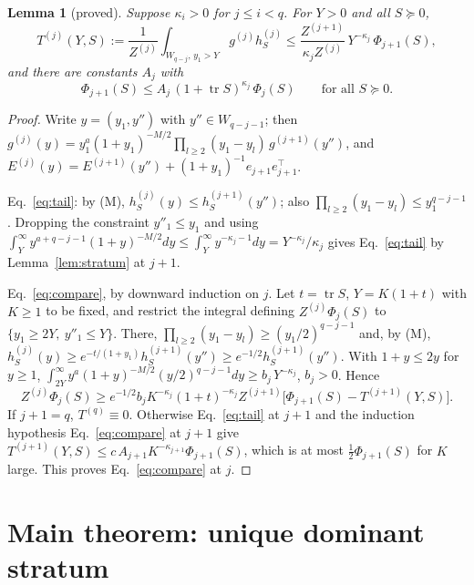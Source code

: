 \documentclass[11pt]{article}
\newcommand{\tr}{\operatorname{tr}}
\newtheorem{lemma}[theorem]{Lemma}
\theoremstyle{remark}
\begin{document}
\begin{lemma}[proved]\label{lem:compare}
Suppose $\kappa_i>0$ for $j\le i<q$.
For $Y>0$ and all $S\succeq0$,
\begin{equation}
  T^{(j)}(Y,S):=\frac1{Z^{(j)}}\int_{W_{q-j},\,y_1>Y}g^{(j)}h^{(j)}_S\le\frac{Z^{(j+1)}}{\kappa_jZ^{(j)}}\,Y^{-\kappa_j}\,\Phi_{j+1}(S),
  \label{eq:tail}
\end{equation}
and there are constants $A_j$ with
\begin{equation}
  \Phi_{j+1}(S)\le A_j\,(1+\tr S)^{\kappa_j}\,\Phi_j(S)\qquad\text{for all }S\succeq0.
  \label{eq:compare}
\end{equation}
\end{lemma}

\begin{proof}
Write $y=(y_1,y'')$ with $y''\in W_{q-j-1}$; then $g^{(j)}(y)=y_1^a(1+y_1)^{-M/2}\prod_{l\ge2}(y_1-y_l)\,g^{(j+1)}(y'')$, and $E^{(j)}(y)=E^{(j+1)}(y'')+(1+y_1)^{-1}e_{j+1}e_{j+1}^\top$.

Eq.~\eqref{eq:tail}: by (M), $h^{(j)}_S(y)\le h^{(j+1)}_S(y'')$; also $\prod_{l\ge2}(y_1-y_l)\le y_1^{q-j-1}$.
Dropping the constraint $y''_1\le y_1$ and using $\int_Y^\infty y^{a+q-j-1}(1+y)^{-M/2}dy\le\int_Y^\infty y^{-\kappa_j-1}dy=Y^{-\kappa_j}/\kappa_j$ gives Eq.~\eqref{eq:tail} by Lemma~\ref{lem:stratum} at $j+1$.

Eq.~\eqref{eq:compare}, by downward induction on $j$.
Let $t=\tr S$, $Y=K(1+t)$ with $K\ge1$ to be fixed, and restrict the integral defining $Z^{(j)}\Phi_j(S)$ to $\{y_1\ge2Y,\ y''_1\le Y\}$.
There, $\prod_{l\ge2}(y_1-y_l)\ge(y_1/2)^{q-j-1}$ and, by (M), $h^{(j)}_S(y)\ge e^{-t/(1+y_1)}h^{(j+1)}_S(y'')\ge e^{-1/2}h^{(j+1)}_S(y'')$.
With $1+y\le2y$ for $y\ge1$, $\int_{2Y}^\infty y^a(1+y)^{-M/2}(y/2)^{q-j-1}dy\ge b_j\,Y^{-\kappa_j}$, $b_j>0$.
Hence
\begin{equation}
  Z^{(j)}\Phi_j(S)\ge e^{-1/2}b_jK^{-\kappa_j}(1+t)^{-\kappa_j}Z^{(j+1)}\big[\Phi_{j+1}(S)-T^{(j+1)}(Y,S)\big].
\end{equation}
If $j+1=q$, $T^{(q)}\equiv0$.
Otherwise Eq.~\eqref{eq:tail} at $j+1$ and the induction hypothesis Eq.~\eqref{eq:compare} at $j+1$ give $T^{(j+1)}(Y,S)\le c\,A_{j+1}K^{-\kappa_{j+1}}\Phi_{j+1}(S)$, which is at most $\tfrac12\Phi_{j+1}(S)$ for $K$ large.
This proves Eq.~\eqref{eq:compare} at $j$.
\end{proof}

\section{Main theorem: unique dominant stratum}
\end{document}
